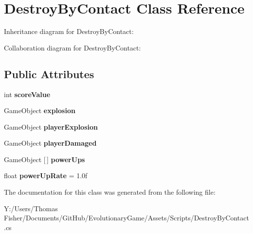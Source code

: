 \hypertarget{class_destroy_by_contact}{}\section{Destroy\+By\+Contact Class Reference}
\label{class_destroy_by_contact}


Inheritance diagram for Destroy\+By\+Contact\+:


Collaboration diagram for Destroy\+By\+Contact\+:
\subsection*{Public Attributes}
\begin{DoxyCompactItemize}
\item 
\mbox{\label{class_destroy_by_contact_ade43cde1e97c99e08a7def340e7bd81f}} 
int {\bfseries score\+Value}
\item 
\mbox{\label{class_destroy_by_contact_ab3754c09fbf46c8526cd1b7c44d3dd23}} 
Game\+Object {\bfseries explosion}
\item 
\mbox{\label{class_destroy_by_contact_a8b4e88cc021761ce871cd133a077c60d}} 
Game\+Object {\bfseries player\+Explosion}
\item 
\mbox{\label{class_destroy_by_contact_ace735383e8ae32b9828cee9769ce5dfb}} 
Game\+Object {\bfseries player\+Damaged}
\item 
\mbox{\label{class_destroy_by_contact_a63dfba8123259d0ab982f3d6e3420653}} 
Game\+Object \mbox{[}$\,$\mbox{]} {\bfseries power\+Ups}
\item 
\mbox{\label{class_destroy_by_contact_a012ac98f060806df9787beec51725443}} 
float {\bfseries power\+Up\+Rate} = 1.\+0f
\end{DoxyCompactItemize}


The documentation for this class was generated from the following file\+:\begin{DoxyCompactItemize}
\item 
Y\+:/\+Users/\+Thomas Fisher/\+Documents/\+Git\+Hub/\+Evolutionary\+Game/\+Assets/\+Scripts/Destroy\+By\+Contact.\+cs\end{DoxyCompactItemize}
